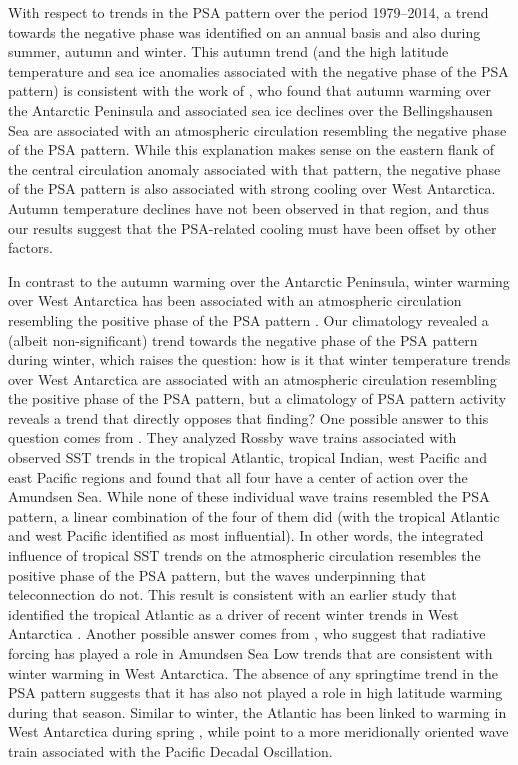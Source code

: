 With respect to trends in the PSA pattern over the period 1979--2014, a trend towards the negative phase was identified on an annual basis and also during summer, autumn and winter. This autumn trend (and the high latitude temperature and sea ice anomalies associated with the negative phase of the PSA pattern) is consistent with the work of \citet{Ding2013}, who found that autumn warming over the Antarctic Peninsula and associated sea ice declines over the Bellingshausen Sea are associated with an atmospheric circulation resembling the negative phase of the PSA pattern. While this explanation makes sense on the eastern flank of the central circulation anomaly associated with that pattern, the negative phase of the PSA pattern is also associated with strong cooling over West Antarctica. Autumn temperature declines have not been observed in that region, and thus our results suggest that the PSA-related cooling must have been offset by other factors. 

In contrast to the autumn warming over the Antarctic Peninsula, winter warming over West Antarctica has been associated with an atmospheric circulation resembling the positive phase of the PSA pattern \citep{Ding2011}. Our climatology revealed a (albeit non-significant) trend towards the negative phase of the PSA pattern during winter, which raises the question: how is it that winter temperature trends over West Antarctica are associated with an atmospheric circulation resembling the positive phase of the PSA pattern, but a climatology of PSA pattern activity reveals a trend that directly opposes that finding? One possible answer to this question comes from \citet{Li2015a}. They analyzed Rossby wave trains associated with observed SST trends in the tropical Atlantic, tropical Indian, west Pacific and east Pacific regions and found that all four have a center of action over the Amundsen Sea. While none of these individual wave trains resembled the PSA pattern, a linear combination of the four of them did (with the tropical Atlantic and west Pacific identified as most influential). In other words, the integrated influence of tropical SST trends on the atmospheric circulation resembles the positive phase of the PSA pattern, but the waves underpinning that teleconnection do not. This result is consistent with an earlier study that identified the tropical Atlantic as a driver of recent winter trends in West Antarctica \citep{Li2014}. Another possible answer comes from \citet{Fogt2015}, who suggest that radiative forcing has played a role in Amundsen Sea Low trends that are consistent with winter warming in West Antarctica. The absence of any springtime trend in the PSA pattern suggests that it has also not played a role in high latitude warming during that season. Similar to winter, the Atlantic has been linked to warming in West Antarctica during spring \citep{Simpkins2014}, while \citet{Clem2015a} point to a more meridionally oriented wave train associated with the Pacific Decadal Oscillation. 


